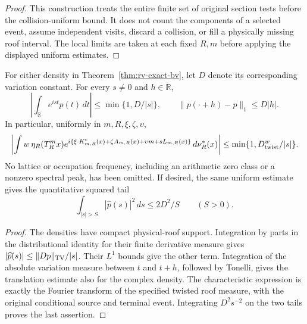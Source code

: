 \begin{proof}
This construction treats the entire finite set of original section
tests before the collision-uniform bound. It does not count the
components of a selected event, assume independent visits, discard a
collision, or fill a physically missing roof interval. The local
limits are taken at each fixed $R,m$ before applying the displayed
uniform estimates.
\end{proof}

\begin{corollary}
\label{cor:rv-fourier}
For either density in Theorem~\ref{thm:rv-exact-bv}, let $D$ denote
its corresponding variation constant. For every $s\ne0$ and
$h\in\mathbb R$,
\begin{equation}\label{eq:rv-fourier}
 \left|\int_{\mathbb R}e^{ist}p(t)\,dt\right|
                 \le\min\{1,D/|s|\},\qquad
 \|p(\cdot+h)-p\|_1\le D|h|.
\end{equation}
In particular, uniformly in $m,R,\xi,\zeta,\upsilon$,
\begin{equation}\label{eq:rv-joint-characteristic}
 \left|\int w\,\eta_R(T_R^mx)
       e^{i\{\xi\cdot K^{\rm c}_{m,R}(x)+\zeta A_{m,R}(x)
                  +\upsilon m+sL_{m,R}(x)\}}\,d\nu_R^*(x)\right|
              \le\min\{1,D_{\rm twist}^{w}/|s|\}.
\end{equation}
No lattice or occupation frequency, including an arithmetic zero
class or a nonzero spectral peak, has been omitted. If desired,
the same uniform estimate gives the quantitative squared tail
\[
     \int_{|s|>S}|\widehat p(s)|^2\,ds\le2D^2/S
                         \qquad(S>0).
\]
\end{corollary}
\begin{proof}
The densities have compact physical-roof support. Integration by
parts in the distributional identity for their finite derivative
measure gives $|\widehat p(s)|\le\|Dp\|_{\rm TV}/|s|$.
Their $L^1$ bounds give the other term. Integration of the absolute
variation measure between $t$ and $t+h$, followed by Tonelli, gives
the translation estimate also for the complex density. The
characteristic expression is exactly the Fourier transform of the
specified twisted roof measure, with the original conditional source
and terminal event. Integrating $D^2s^{-2}$ on the two tails proves
the last assertion.
\end{proof}

